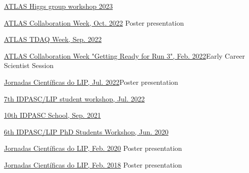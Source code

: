 \begin{cventries}
    {}
    {}
    {\href{https://indico.cern.ch/event/1280531/contributions/5559532/}{ATLAS Higgs group workshop 2023}}{}\vspace*{2mm}

    {}
    {}
    {\href{https://indico.cern.ch/event/1187086/\#37-the-atlas-jet-trigger-in-ru}{ATLAS Collaboration Week, Oct. 2022}}
    {Poster presentation}\vspace*{2mm}

    {}
    {}
    {\href{https://indico.cern.ch/event/1172448/contributions/4924082/}{ATLAS TDAQ Week, Sep. 2022}}
    {}\vspace*{2mm}

    {}
    {}
    {\href{https://indico.cern.ch/event/1108354/\#167-readiness-of-the-jet-trigg}{ATLAS Collaboration Week "Getting Ready for Run 3", Feb. 2022}}{Early Career Scientist Session}


    {\href{https://indico.lip.pt/event/1183/}{Jornadas Científicas do LIP, Jul. 2022}}{Poster presentation}

    {\href{https://indico.lip.pt/event/1245/}{7th IDPASC/LIP student workshop, Jul. 2022}}{}
    
    
    {}{\href{https://indico.lip.pt/event/643}{10th IDPASC School, Sep. 2021}}{}

    {}{\href{https://indico.lip.pt/event/699/}{6th IDPASC/LIP PhD Students Workshop, Jun. 2020}}
    {}

    {}{\href{https://indico.lip.pt/event/650/}{Jornadas Científicas do LIP, Feb. 2020}}
    {Poster presentation}

    {}{\href{https://indico.lip.pt/event/359/}{Jornadas Científicas do LIP, Feb. 2018}}
    {Poster presentation}    

\end{cventries}